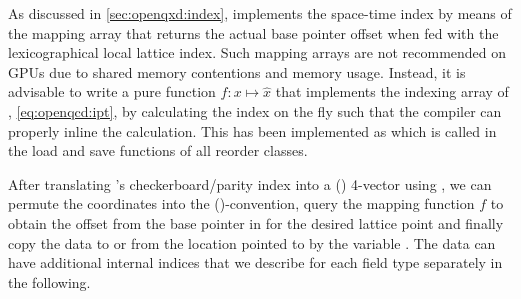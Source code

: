 

As discussed in \cref{sec:openqxd:index}, \openqxd implements the space-time index by means of the mapping array  that returns the actual base pointer offset when fed with the lexicographical local lattice index.
Such mapping arrays are not recommended on GPUs due to shared memory contentions and memory usage.
Instead, it is advisable to write a pure function $f \colon x \mapsto \hat{x}$ that implements the indexing array of \openqxd, \cref{eq:openqcd:ipt}, by calculating the index on the fly such that the compiler can properly inline the calculation.
This has been implemented as  which is called in the load and save functions of all reorder classes.




After translating \quda's checkerboard/parity index into a (\xyzt) 4-vector using , we can permute the coordinates into the (\txyz)-convention, query the mapping function $f$ to obtain the offset from the base pointer in \openqxd for the desired lattice point and finally copy the data to or from the location pointed to by the variable .
The data can have additional internal indices that we describe for each field type separately in the following.

